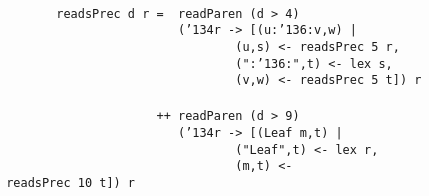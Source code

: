 \begin{figure}
{\mbox{\tt }\\[-8pt]
\mbox{\tt \ \ \ \ \ \ \ \ readsPrec\ d\ r\ =\ \ readParen\ (d\ >\ 4)}\\
\mbox{\tt \ \ \ \ \ \ \ \ \ \ \ \ \ \ \ \ \ \ \ \ \ \ \ \ \ ({\char'134}r\ ->\ [(u:{\char'136}:v,w)\ |}\\
\mbox{\tt \ \ \ \ \ \ \ \ \ \ \ \ \ \ \ \ \ \ \ \ \ \ \ \ \ \ \ \ \ \ \ \ \ (u,s)\ <-\ readsPrec\ 5\ r,}\\
\mbox{\tt \ \ \ \ \ \ \ \ \ \ \ \ \ \ \ \ \ \ \ \ \ \ \ \ \ \ \ \ \ \ \ \ \ (":{\char'136}:",t)\ <-\ lex\ s,}\\
\mbox{\tt \ \ \ \ \ \ \ \ \ \ \ \ \ \ \ \ \ \ \ \ \ \ \ \ \ \ \ \ \ \ \ \ \ (v,w)\ <-\ readsPrec\ 5\ t])\ r}\\
\mbox{\tt }\\[-8pt]
\mbox{\tt \ \ \ \ \ \ \ \ \ \ \ \ \ \ \ \ \ \ \ \ \ \ ++\ readParen\ (d\ >\ 9)}\\
\mbox{\tt \ \ \ \ \ \ \ \ \ \ \ \ \ \ \ \ \ \ \ \ \ \ \ \ \ ({\char'134}r\ ->\ [(Leaf\ m,t)\ |}\\
\mbox{\tt \ \ \ \ \ \ \ \ \ \ \ \ \ \ \ \ \ \ \ \ \ \ \ \ \ \ \ \ \ \ \ \ \ ("Leaf",t)\ <-\ lex\ r,}\\
\mbox{\tt \ \ \ \ \ \ \ \ \ \ \ \ \ \ \ \ \ \ \ \ \ \ \ \ \ \ \ \ \ \ \ \ \ (m,t)\ <-\ readsPrec\ 10\ t])\ r}
}
\label{tree-inst}
\end{figure}

